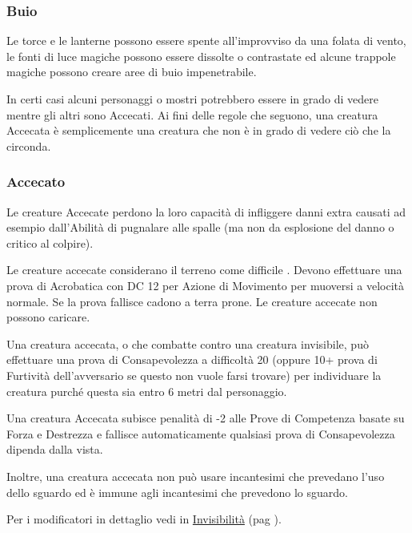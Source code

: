 \begin{multicols}{2}
\subsubsection{Buio}

\label{buio}

Le torce e le lanterne possono essere spente all'improvviso da una folata di vento, le fonti di luce magiche possono essere dissolte o contrastate ed alcune trappole magiche possono creare aree di buio impenetrabile.

In certi casi alcuni personaggi o mostri potrebbero essere in grado di vedere mentre gli altri sono Accecati. Ai fini delle regole che seguono, una creatura Accecata è semplicemente una creatura che non è in grado di vedere ciò che la circonda.

\subsubsection{Accecato}

\label{accecato}

Le creature Accecate perdono la loro capacità di infliggere danni extra causati ad esempio dall'Abilità di pugnalare alle spalle (ma non da esplosione del danno o critico al colpire).

Le creature accecate considerano il terreno come difficile . Devono effettuare una prova di Acrobatica con DC 12 per Azione di Movimento per muoversi a velocità normale. Se la prova fallisce cadono a terra prone. Le creature accecate non possono caricare.

Una creatura accecata, o che combatte contro una creatura invisibile, può effettuare una prova di Consapevolezza a difficoltà 20 (oppure 10+ prova di Furtività dell'avversario se questo non vuole farsi trovare) per individuare la creatura purché questa sia entro 6 metri dal personaggio.

Una creatura Accecata subisce penalità di -2 alle Prove di Competenza basate su Forza e Destrezza e fallisce automaticamente qualsiasi prova di Consapevolezza dipenda dalla vista.

Inoltre, una creatura accecata non può usare incantesimi che prevedano l'uso dello sguardo ed è immune agli incantesimi che prevedono lo sguardo.

Per i modificatori in dettaglio vedi in \hyperlink{invisibilita}{Invisibilità} (pag \pageref{invisibilita}).


\end{multicols}
